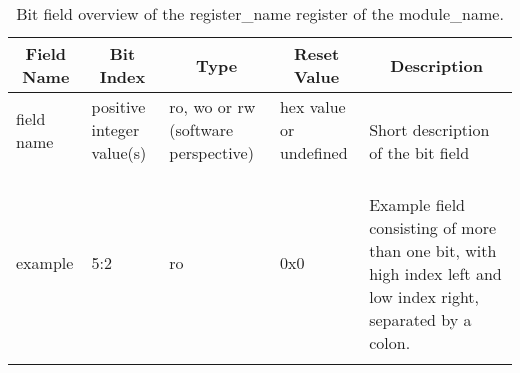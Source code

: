 \begin{longtable}[ht]{|l|l|l|l|l|}
    \hline
    \multicolumn{1}{|c|}{\textbf{Field Name}} & \multicolumn{1}{c|}{\textbf{Bit Index}} & \multicolumn{1}{c|}{\textbf{Type}} & \multicolumn{1}{c|}{\textbf{Reset Value}} & \multicolumn{1}{c|}{\textbf{Description}}\\
    \hline
    field name & positive integer value(s) & ro, wo or rw (software perspective) & hex value or undefined & \parbox{5cm}{\ \\
        Short description of the bit field\\
    }\\
    \hline
    example & 5:2 & ro & 0x0 & \parbox{5cm}{\ \\
        Example field consisting of more than one bit, with high index left and low index right, separated by a colon.\\
    }\\
    \hline
    \caption{Bit field overview of the register\_name register of the module\_name.}
    \label{table:appropriate-label}
\end{longtable}